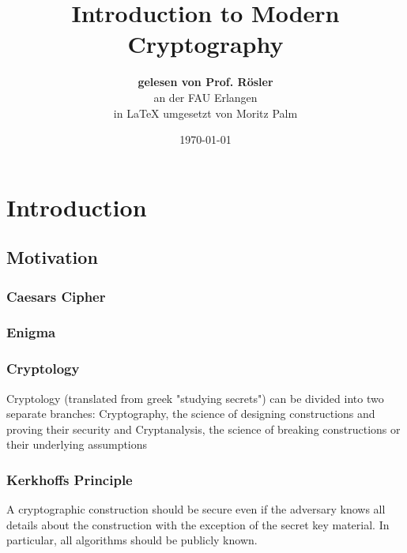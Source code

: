 \documentclass[11pt,a4paper,headinclude,twoside, open=right,numbers=noenddot]{scrreprt}
\title{Introduction to Modern Cryptography}
\author{ \textbf{gelesen von Prof. Rösler} \\
    an der FAU Erlangen \\
    \vspace{1cm}
    in \LaTeX{} umgesetzt von Moritz Palm \\
}
\date{\today}
\begin{document}
\maketitle
\tableofcontents

\chapter{Introduction}
\label{chap:introduction}

\section{Motivation}
\label{sec:motivation}

\subsection{Caesars Cipher}
\label{ssec:casears_cipher}

\subsection{Enigma}
\label{ssec:enigma}

\subsection{Cryptology}
\label{ssec:cryptology}
Cryptology (translated from greek "studying secrets") can be divided into two separate branches: Cryptography, the science of designing constructions and proving their security and Cryptanalysis, the science of breaking constructions or their underlying assumptions


\subsection{Kerkhoffs Principle}
\label{ssec:kerkhoffs_principle}

\begin{displayquote}
A cryptographic construction should be secure even if the adversary knows all details about the construction with the exception of the secret key material. In particular, all algorithms should be publicly known.
\end{displayquote}
\end{document}
